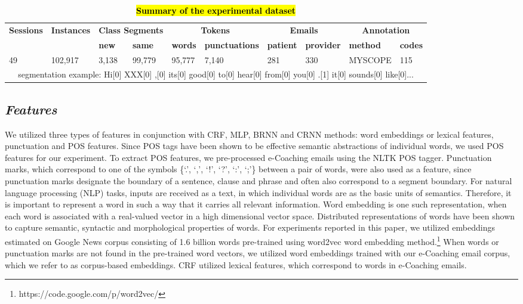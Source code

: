 \documentclass{amia}
\begin{document}
\begin{table}[ht]
\centering
\caption{\textbf{\hl{Summary of the experimental dataset}}}
\label{tab:datastat}
 \begin{tabular}{|l|l|l|l|l|l|l|l|l|l|}
  \hline
   \multirow{2}{*}{\textbf{Sessions}} & \multirow{2}{*}{\textbf{Instances}} & \multicolumn{2}{|c|}{\textbf{Class Segments}} & \multicolumn{2}{|c|}{\textbf{Tokens}} & \multicolumn{2}{|c|}{\textbf{Emails}} & \multicolumn{2}{|c|}{\textbf{Annotation}} \\\cline{3-10}
   &  & \textbf{new}  & \textbf{same} & \textbf{words} & \textbf{punctuations}  & \textbf{patient} & \textbf{provider} & \textbf{method}  & \textbf{codes} \\ \hline    
 49 & 102,917 & 3,138 & 99,779 & 95,777 & 7,140 & 281 & 330 & MYSCOPE & 115 \\ \hline
 \multicolumn{10}{|c|}{segmentation example: Hi[0] XXX[0] ,[0] its[0] good[0] to[0] hear[0] from[0] you[0] .[1] it[0] sounds[0] like[0]...} \\ \hline
  \end{tabular}
\end{table}     

\subsection*{\textit{Features}}
We utilized three types of features in conjunction with CRF, MLP, BRNN and CRNN methods: word embeddings or lexical features, punctuation and POS features. Since POS tags have been shown to be effective semantic abstractions of individual words, we used POS features for our experiment.\cite{liu2005using,treviso2017sentence} To extract POS features, we pre-processed e-Coaching emails using the NLTK POS tagger. Punctuation marks, which correspond to one of the symbols \{`.', `,', `!', `?', `:', `;'\} between a pair of words, were also used as a feature, since punctuation marks designate the boundary of a sentence, clause and phrase and often also correspond to a segment boundary.\cite{cho2002text} For natural language processing (NLP) tasks, inputs are received as a text, in which individual words are as the basic units of semantics. Therefore, it is important to represent a word in such a way that it carries all relevant information. Word embedding is one such representation, when each word is associated with a real-valued vector in a high dimensional vector space. Distributed representations of words have been shown to capture semantic, syntactic and morphological properties of words.\cite{pennington2014glove, mikolov2013distributed} For experiments reported in this paper, we utilized embeddings estimated on Google News corpus consisting of 1.6 billion words pre-trained using word2vec word embedding method.\footnote{\label{fn:word2vec}https://code.google.com/p/word2vec/} When words or punctuation marks are not found in the pre-trained word vectors, we utilized word embeddings trained with our e-Coaching email corpus, which we refer to as corpus-based embeddings. CRF utilized lexical features, which correspond to words in e-Coaching emails. 
\end{document}
